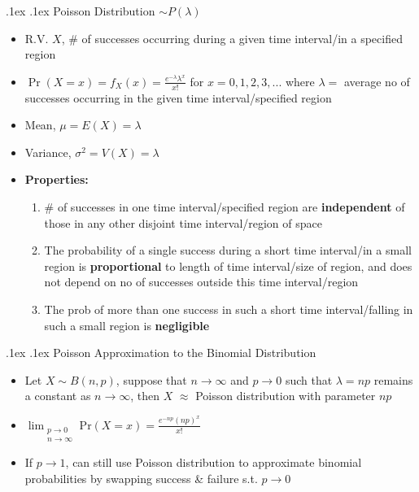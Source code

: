 \documentclass[10pt,landscape,a4paper]{article}
\makeatletter
\renewcommand{\subsection}{\@startsection{subsection}{1}{0mm}%
  {.1ex}%
  {.1ex}%
  {\sffamily\bfseries}}
\makeatother
\begin{document}
\begin{multicols*}{4}
  \subsection{Poisson Distribution $\sim P(\lambda)$}
  \begin{itemize}
    \item R.V. $X$, \# of successes occurring during a given time interval/in a specified region
    \item $\Pr(X=x)=f_X(x)=\frac{e^{-\lambda}\lambda^x}{x!}$ for $x=0,1,2,3,...$ where $\lambda = $ average no of successes occurring in the given time interval/specified region
    \item Mean, $\mu =E(X) = \lambda$
    \item Variance, $\sigma^2 = V(X) = \lambda$
    \item \textbf{Properties:} 
        \begin{enumerate}
            \item \# of successes in one time interval/specified region are \textbf{independent} of those in any other disjoint time interval/region of space
            \item The probability of a single success during a short time interval/in a small region is \textbf{proportional} to length of time interval/size of region, and does not depend on no of successes outside this time interval/region
            \item The prob of more than one success in such a short time interval/falling in such a small region is \textbf{negligible}
        \end{enumerate}
  \end{itemize}
  \subsection{Poisson Approximation to the Binomial Distribution}
  \begin{itemize}
    \item Let $X \sim B(n, p)$, suppose that $n \rightarrow \infty$ and $p \rightarrow 0$ such that $\lambda = np$ remains a constant as $n \rightarrow\infty$, then $X$ $\approx$ Poisson distribution with parameter $np$
    \item $\lim_{\substack{p\rightarrow0\\n\rightarrow\infty}}\text{Pr}(X=x)=\frac{e^{-np}(np)^x}{x!}$
    \item If $p\rightarrow 1$, can still use Poisson distribution to approximate binomial probabilities by swapping success \& failure s.t. $p \rightarrow 0$
  \end{itemize}

\end{multicols*}
\end{document}
